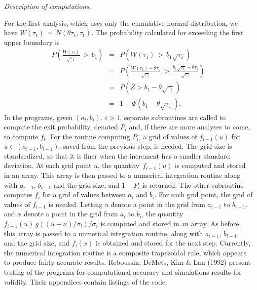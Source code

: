 \vspace*{2em}
\noindent
{\em Description of computations.}

For the first analysis, which uses only the cumulative normal distribution,
we have $W(\tau_1) \, \sim \, N(\theta \tau_1, \tau_1)$.  The probability
calculated for exceeding the first upper boundary is
\begin{eqnarray*}
  P \left(\frac{W(\tau_1)}{\sqrt{\tau_1}} \, > \, b_1 \right)
  & = & P \left(W(\tau_1) \, > \, b_1 \sqrt{\tau_1} \right) \\
  & = & P \left(\frac{    W(\tau_1)             - \theta \tau_1}
                     {\sqrt{\tau_1}}
                     \, > \, 
                \frac{b_1 \sqrt{\tau_1} - \theta \tau_1}
                     {\sqrt{\tau_1}} \right) \\
  & = & P \left(Z > b_1 - \theta \sqrt{\tau_1} \right) \\
  & = & 1 - \Phi \left( b_1 - \theta \sqrt{\tau_1} \right).
\end{eqnarray*}
In the programs, given $(a_i, b_i), \, i > 1$, separate subroutines are
called to compute the exit probability, denoted $P_i$ and, if there are
more analyses to come, to compute $f_i$.  For the routine computing $P_i$,
a grid of values of $f_{i-1}(u)$ for $u \in (a_{i-1},b_{i-1})$, saved from
the previous step, is needed.  The grid size is standardized, so that it is
finer when the increment has a smaller standard deviation.  At each grid
point $u$, the quantity
\begin{math}
  [\Phi((b_i-u)/\sigma_i) - \Phi((a_i-u)/\sigma_i)] \, f_{i-1}(u)
\end{math}
is computed and stored in an array.  This array is then passed to a
numerical integration routine along with $a_{i-1},\,b_{i-1}$ and the grid
size, and $1-P_i$ is returned.  The other
subroutine computes $f_i$ for a grid of values between $a_i$ and $b_i$.
For each grid point, the grid of values of $f_{i-1}$ is needed.  Letting
$u$ denote a point in the grid from $a_{i-1}$ to $b_{i-1},$ and $x$ denote
a point in the grid from $a_i$ to $b_i$, the quantity
\begin{math}
  f_{i-1}(u) \: g((u-x)/\sigma_i)/\sigma_i
\end{math}
is computed and stored in an array.  As before, this array is passed to a
numerical integration routine, along with $a_{i-1},\,b_{i-1},$ and the grid
size, and $f_i(x)$ is obtained and stored for the next step.  Currently,
the numerical integration routine is a composite trapezoidal rule, which
appears to produce fairly accurate results.  Reboussin, DeMets, Kim \& Lan
(1992) present testing of the programs for computational accuracy and
simulations results for validity.  Their appendices contain listings of the
code.

